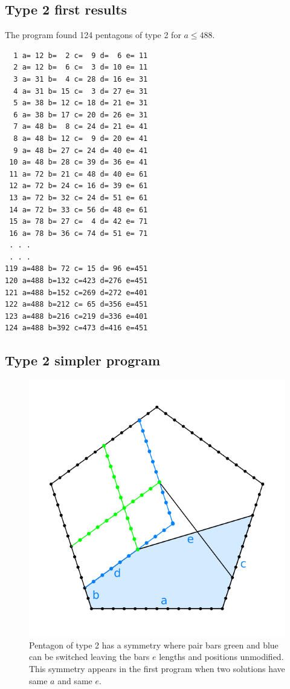 \documentclass[11pt]{article}
\begin{document}
\subsection{Type 2 first results}
The program found 124 pentagons of type 2 for $a \leq 488$.

\begin{lstlisting}
  1 a= 12 b=  2 c=  9 d=  6 e= 11
  2 a= 12 b=  6 c=  3 d= 10 e= 11
  3 a= 31 b=  4 c= 28 d= 16 e= 31
  4 a= 31 b= 15 c=  3 d= 27 e= 31
  5 a= 38 b= 12 c= 18 d= 21 e= 31
  6 a= 38 b= 17 c= 20 d= 26 e= 31
  7 a= 48 b=  8 c= 24 d= 21 e= 41
  8 a= 48 b= 12 c=  9 d= 20 e= 41
  9 a= 48 b= 27 c= 24 d= 40 e= 41
 10 a= 48 b= 28 c= 39 d= 36 e= 41
 11 a= 72 b= 21 c= 48 d= 40 e= 61
 12 a= 72 b= 24 c= 16 d= 39 e= 61
 13 a= 72 b= 32 c= 24 d= 51 e= 61
 14 a= 72 b= 33 c= 56 d= 48 e= 61
 15 a= 78 b= 27 c=  4 d= 42 e= 71
 16 a= 78 b= 36 c= 74 d= 51 e= 71
 . . .
 . . .
119 a=488 b= 72 c= 15 d= 96 e=451
120 a=488 b=132 c=423 d=276 e=451
121 a=488 b=152 c=269 d=272 e=401
122 a=488 b=212 c= 65 d=356 e=451
123 a=488 b=216 c=219 d=336 e=401
124 a=488 b=392 c=473 d=416 e=451
\end{lstlisting}


\subsection{Type 2 simpler program}

\begin{figure}[htpb]
\centering
\includegraphics[scale=0.75]{figs/type-2-double}
\caption{Pentagon of type 2 has a symmetry where pair bars green and blue can be switched leaving
the bars $e$ lengths and positions unmodified. This symmetry appears in the first program when two solutions have same $a$ and same $e$.}
\label{fig:type-2-double}
\end{figure}
\end{document}
